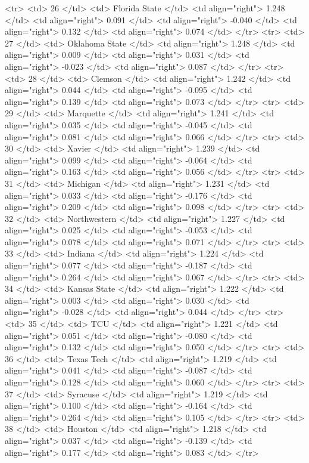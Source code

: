  <tr> <td> 26 </td> <td> Florida State </td> <td align="right"> 1.248 </td> <td align="right"> 0.091 </td> <td align="right"> -0.040 </td> <td align="right"> 0.132 </td> <td align="right"> 0.074 </td> </tr>
  <tr> <td> 27 </td> <td> Oklahoma State </td> <td align="right"> 1.248 </td> <td align="right"> 0.009 </td> <td align="right"> 0.031 </td> <td align="right"> -0.023 </td> <td align="right"> 0.087 </td> </tr>
  <tr> <td> 28 </td> <td> Clemson </td> <td align="right"> 1.242 </td> <td align="right"> 0.044 </td> <td align="right"> -0.095 </td> <td align="right"> 0.139 </td> <td align="right"> 0.073 </td> </tr>
  <tr> <td> 29 </td> <td> Marquette </td> <td align="right"> 1.241 </td> <td align="right"> 0.035 </td> <td align="right"> -0.045 </td> <td align="right"> 0.081 </td> <td align="right"> 0.066 </td> </tr>
  <tr> <td> 30 </td> <td> Xavier </td> <td align="right"> 1.239 </td> <td align="right"> 0.099 </td> <td align="right"> -0.064 </td> <td align="right"> 0.163 </td> <td align="right"> 0.056 </td> </tr>
  <tr> <td> 31 </td> <td> Michigan </td> <td align="right"> 1.231 </td> <td align="right"> 0.033 </td> <td align="right"> -0.176 </td> <td align="right"> 0.209 </td> <td align="right"> 0.098 </td> </tr>
  <tr> <td> 32 </td> <td> Northwestern </td> <td align="right"> 1.227 </td> <td align="right"> 0.025 </td> <td align="right"> -0.053 </td> <td align="right"> 0.078 </td> <td align="right"> 0.071 </td> </tr>
  <tr> <td> 33 </td> <td> Indiana </td> <td align="right"> 1.224 </td> <td align="right"> 0.077 </td> <td align="right"> -0.187 </td> <td align="right"> 0.264 </td> <td align="right"> 0.067 </td> </tr>
  <tr> <td> 34 </td> <td> Kansas State </td> <td align="right"> 1.222 </td> <td align="right"> 0.003 </td> <td align="right"> 0.030 </td> <td align="right"> -0.028 </td> <td align="right"> 0.044 </td> </tr>
  <tr> <td> 35 </td> <td> TCU </td> <td align="right"> 1.221 </td> <td align="right"> 0.051 </td> <td align="right"> -0.080 </td> <td align="right"> 0.132 </td> <td align="right"> 0.050 </td> </tr>
  <tr> <td> 36 </td> <td> Texas Tech </td> <td align="right"> 1.219 </td> <td align="right"> 0.041 </td> <td align="right"> -0.087 </td> <td align="right"> 0.128 </td> <td align="right"> 0.060 </td> </tr>
  <tr> <td> 37 </td> <td> Syracuse </td> <td align="right"> 1.219 </td> <td align="right"> 0.100 </td> <td align="right"> -0.164 </td> <td align="right"> 0.264 </td> <td align="right"> 0.105 </td> </tr>
  <tr> <td> 38 </td> <td> Houston </td> <td align="right"> 1.218 </td> <td align="right"> 0.037 </td> <td align="right"> -0.139 </td> <td align="right"> 0.177 </td> <td align="right"> 0.083 </td> </tr>

